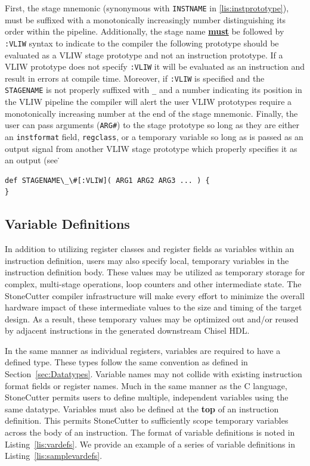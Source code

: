 \documentclass{article}
\begin{document}
First, the stage mnemonic (synonymous with \texttt{INSTNAME} in \ref{lis:instprototype}), must be suffixed with a monotonically increasingly number
distinguishing its order within the pipeline. 
Additionally, the stage name \underline{\textbf{must}} be followed by \texttt{:VLIW} syntax to indicate to the compiler the following prototype 
should be evaluated as a VLIW stage prototype and not an instruction prototype. 
If a VLIW prototype does not specify \texttt{:VLIW} it will be evaluated as an instruction and result in errors at compile time. 
Moreover, if \texttt{:VLIW} is specified and the \texttt{STAGENAME} is not properly suffixed with \texttt{\_} and a number indicating its position 
in the VLIW pipeline the compiler will alert the user VLIW prototypes require a monotonically increasing number at the end of the stage mnemonic. 
Finally, the user can pass arguments (\texttt{ARG\#}) to the stage prototype so long as they are either an \texttt{instformat} field, \texttt{regclass}, or a 
temporary variable so long as is passed as an output signal from another VLIW stage prototype which properly specifies it as an output (see \. 

\vspace{0.125in}
\begin{lstlisting}[frame=single,style=base,caption={VLIW Stage Prototype Format},captionpos=b,label={lis:vliwprototype}]
def STAGENAME\_\#[:VLIW]( ARG1 ARG2 ARG3 ... ) {
}
\end{lstlisting}


\subsection{Variable Definitions}
\label{sec:Variable Definitions}

In addition to utilizing register classes and register fields as variables within 
an instruction definition, users may also specify local, temporary variables 
in the instruction definition body.  These values may be utilized as temporary 
storage for complex, multi-stage operations, loop counters and other intermediate 
state.  The StoneCutter compiler infrastructure will make every effort to minimize the overall 
hardware impact of these intermediate values to the size and timing of the target design.  As a result, 
these temporary values may be optimized out and/or reused by adjacent instructions 
in the generated downstream Chisel HDL.  

In the same manner as individual registers, variables are required to have a defined type.  
These types follow the same convention as defined in Section~\ref{sec:Datatypes}.  Variable 
names may not collide with existing instruction format fields or register names.  Much in the same 
manner as the C language, StoneCutter permits users to define multiple, independent variables 
using the same datatype.  Variables must also be defined at the \textbf{top} of an instruction 
definition.  This permits StoneCutter to sufficiently scope temporary variables across the body 
of an instruction.  The format of 
variable definitions is noted in Listing~\ref{lis:vardefs}.  We provide an example of a series of 
variable definitions in Listing~\ref{lis:samplevardefs}.  
\end{document}
